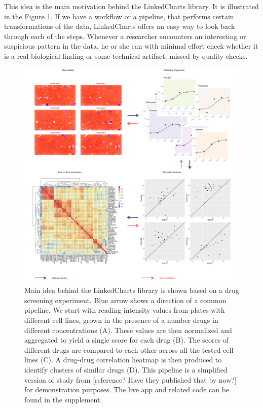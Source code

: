 \documentclass[twocolumn,10pt]{article}
\begin{document}
This idea is the main motivation behind the LinkedCharts library. It is illustrated in the Figure \ref{FigC}. If we have a workflow or a pipeline, that performs certain transformations of the data, LinkedCharts offers an easy way to look back through each of the steps. Whenever a researcher encounters an interesting or suspicious pattern in the data, he or she can with minimal effort check  whether it is a real biological finding or some technical artifact, missed by quality checks. 

\begin{figure}
	\includegraphics[width=\textwidth]{FigC/figC.png}
	\caption{Main idea behind the LinkedCharts library is shown based on a drug screening experiment. Blue arrow shows a direction of a common pipeline. We start with reading intensity values from plates with different cell lines, grown in the presence of a number drugs in different concentrations (A). These values are then normalized and aggregated to yield a single score for each drug (B). The scores of different drugs are compared to each other across all the tested cell lines (C). A drug-drug correlation heatmap is then produced to identify clusters of similar drugs (D). This pipeline is a simplified version of study from [reference? Have they published that by now?] for demonstration purposes. The live app and related code can be found in the supplement.}
	\label{FigC}
\end{figure}
\end{document}
